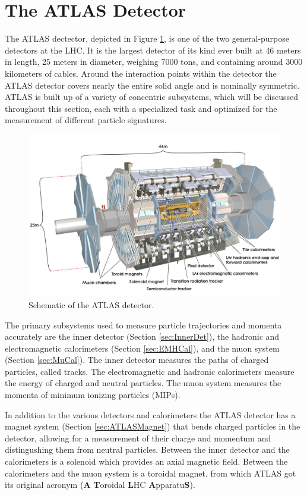 \section{The ATLAS Detector}
\label{sec:ATLAS}
The ATLAS dectector, depicted in Figure \ref{fig:ATLASOverview}, is one of the two general-purpose detectors at the LHC.  It is the largest detector of its kind ever built at 46 meters in length, 25 meters in diameter, weighing 7000 tons, and containing around 3000 kilometers of cables\cite{ATLAS}.  Around the interaction points within the detector the ATLAS detector covers nearly the entire solid angle and is nominally symmetric.  ATLAS is built up of a variety of concentric subsystems, which will be discussed throughout this section, each with a specialized task and optimized for the measurement of different particle signatures.  
\begin{figure}[ht!]
	\centering
	\includegraphics[width=\columnwidth]{../ThesisImages/LHCImages/AtlasDetector.png}
	\caption[Schematic of the ATLAS detector.]{Schematic of the ATLAS detector\cite{ATLAS}.
	}
	\label{fig:ATLASOverview}
\end{figure}
The primary subsystems used to measure particle trajectories and momenta accurately are the inner detector (Section \ref{sec:InnerDet}), the hadronic and electromagnetic calorimeters (Section \ref{sec:EMHCal}), and the muon system (Section \ref{sec:MuCal}).  The inner detector measures the paths of charged particles, called tracks.  The electromagnetic and hadronic calorimeters measure the energy of charged and neutral particles. The muon system measures the momenta of minimum ionizing particles (MIPs).  

In addition to the various detectors and calorimeters the ATLAS detector has a magnet system (Section \ref{sec:ATLASMagnet}) that bends charged particles in the detector, allowing for a measurement of their charge and momentum and distingushing them from neutral particles.  Between the inner detector and the calorimeters is a solenoid which provides an axial magnetic field.  Between the calorimeters and the muon system is a toroidal magnet, from which ATLAS got its original acronym (\textbf{A} \textbf{T}oroidal \textbf{L}HC \textbf{A}pparatu\textbf{S}).



